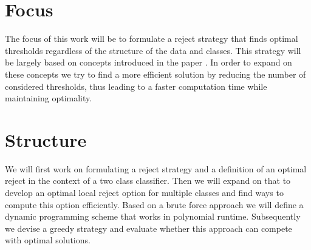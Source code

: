 \cite{Ste:2000}

\section{Focus}
\label{focus}
The focus of this work will be to formulate a reject strategy that finds optimal thresholds regardless of the  structure of the data and classes. This strategy will be largely based on concepts introduced in the paper \cite{Fis:2015}. In order to expand on these concepts we try to find a more efficient solution by reducing the number of considered thresholds, thus leading to a faster computation time while maintaining optimality.

\section{Structure}
We will first work on formulating a reject strategy and a definition of an optimal reject in the context of a two class classifier. Then we will expand on that to develop an optimal local reject option for multiple classes and find ways to compute this option efficiently. Based on a brute force approach we will define a dynamic programming scheme that works in polynomial runtime. Subsequently we devise a greedy strategy and evaluate whether this approach can compete with optimal solutions.